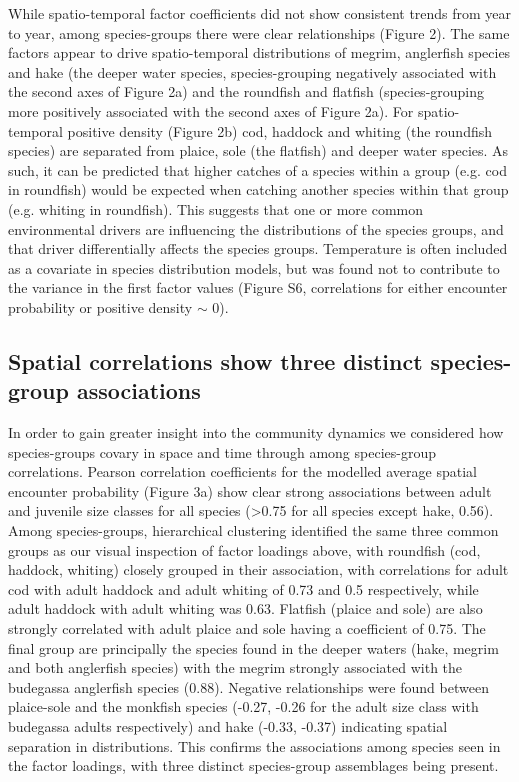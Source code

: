 \documentclass{nature}
\begin{document}
\begin{linenumbers}
While spatio-temporal factor coefficients did not show consistent trends from
year to year, among species-groups there were clear relationships (Figure 2).
The same factors appear to drive spatio-temporal distributions of megrim,
anglerfish species and hake (the deeper water species, species-grouping
negatively associated with the second axes of Figure 2a) and the roundfish and
flatfish (species-grouping more positively associated with the second axes of
Figure 2a). For spatio-temporal positive density (Figure 2b) cod, haddock and
whiting (the roundfish species) are separated from plaice, sole (the flatfish)
and deeper water species. As such, it can be predicted that higher catches of a
species within a group (e.g. cod in roundfish) would be expected when catching
another species within that group (e.g. whiting in roundfish). This suggests
that one or more common environmental drivers are influencing the distributions
of the species groups, and that driver differentially affects the species
groups. Temperature is often included as a covariate in species distribution
models, but was found not to contribute to the variance in the first factor
values (Figure S6, correlations for either encounter probability or positive
density $\sim$ 0).

\subsection{Spatial correlations show three distinct species-group
	associations} In order to gain greater insight into the community
dynamics we considered how species-groups covary in space and time through
among species-group correlations. Pearson correlation coefficients for the
modelled average spatial encounter probability (Figure 3a) show clear strong
associations between adult and juvenile size classes for all species
(\textgreater 0.75 for all species except hake, 0.56).  Among species-groups,
hierarchical clustering identified the same three common groups as our visual
inspection of factor loadings above, with roundfish (cod, haddock, whiting)
closely grouped in their association, with correlations for adult cod with
adult haddock and adult whiting of 0.73 and 0.5 respectively, while adult
haddock with adult whiting was 0.63. Flatfish (plaice and sole) are also
strongly correlated with adult plaice and sole having a coefficient of 0.75.
The final group are principally the species found in the deeper waters (hake,
megrim and both anglerfish species) with the megrim strongly associated with
the budegassa anglerfish species (0.88). Negative relationships were found
between plaice-sole and the monkfish species (-0.27, -0.26 for the adult size
class with budegassa adults respectively) and hake (-0.33, -0.37) indicating
spatial separation in distributions. This confirms the associations among
species seen in the factor loadings, with three distinct species-group
assemblages being present.


\end{linenumbers}
\end{document}
